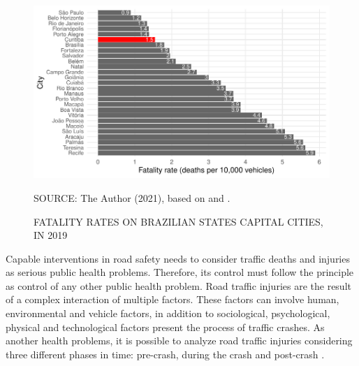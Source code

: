 \begin{figure}[!htbp]
    \centering\footnotesize
    \captionsetup{font=footnotesize}
    \caption{FATALITY RATES ON BRAZILIAN STATES CAPITAL CITIES, IN 2019}
    \includegraphics{fig/cap_fatal.pdf}
    \label{fig:cap_fatal}
    \par SOURCE: The Author (2021), based on \textcite{MinistryofHealth2020} and \textcite{DENATRAN2020}.
\end{figure} 







Capable interventions in road safety needs to consider traffic deaths and injuries as serious public health problems. Therefore, its control must follow the principle as control of any other public health problem. Road traffic injuries are the result of a complex interaction of multiple factors. These factors can involve human, environmental and vehicle factors, in addition to sociological, psychological, physical and technological factors present the process of traffic crashes. As another health problems, it is possible to analyze road traffic injuries considering three different phases in time: pre-crash, during the crash and post-crash \cite{Mohan2016}.

